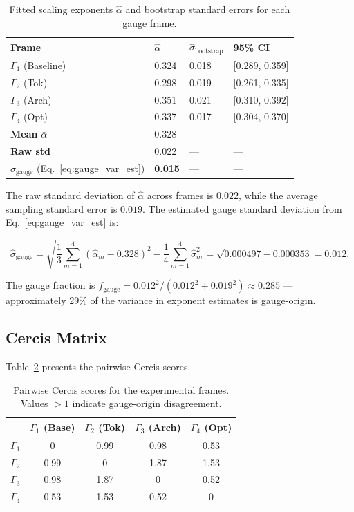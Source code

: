 \documentclass[12pt,a4paper]{article}
\theoremstyle{remark}
\begin{document}
\begin{table}[H]
\centering
\caption{Fitted scaling exponents $\hat{\alpha}$ and bootstrap standard errors for each gauge frame.}
\label{tab:results}
\begin{tabular}{@{}llll@{}}
\toprule
\textbf{Frame} & $\hat{\alpha}$ & $\hat{\sigma}_{\text{bootstrap}}$ & 95\% CI \\
\midrule
$\Gamma_1$ (Baseline) & 0.324 & 0.018 & [0.289, 0.359] \\
$\Gamma_2$ (Tok) & 0.298 & 0.019 & [0.261, 0.335] \\
$\Gamma_3$ (Arch) & 0.351 & 0.021 & [0.310, 0.392] \\
$\Gamma_4$ (Opt) & 0.337 & 0.017 & [0.304, 0.370] \\
\midrule
\textbf{Mean} $\bar{\alpha}$ & 0.328 & — & — \\
\textbf{Raw std} & 0.022 & — & — \\
\textbf{$\hat{\sigma}_{\text{gauge}}$} (Eq.~\ref{eq:gauge_var_est}) & \textbf{0.015} & — & — \\
\bottomrule
\end{tabular}
\end{table}

The raw standard deviation of $\hat{\alpha}$ across frames is $0.022$, while the average sampling standard error is $0.019$. The estimated gauge standard deviation from Eq.~\eqref{eq:gauge_var_est} is:

\begin{equation}
\hat{\sigma}_{\text{gauge}} = \sqrt{\frac{1}{3}\sum_{m=1}^4 (\hat{\alpha}_m - 0.328)^2 - \frac{1}{4}\sum_{m=1}^4 \hat{\sigma}_m^2} = \sqrt{0.000497 - 0.000353} = 0.012.
\end{equation}

The gauge fraction is $f_{\text{gauge}} = 0.012^2 / (0.012^2 + 0.019^2) \approx 0.285$ — approximately 29\% of the variance in exponent estimates is gauge-origin.

\subsection{Cercis Matrix}

Table~\ref{tab:cercis_exp} presents the pairwise Cercis scores.

\begin{table}[H]
\centering
\caption{Pairwise Cercis scores for the experimental frames. Values $> 1$ indicate gauge-origin disagreement.}
\label{tab:cercis_exp}
\begin{tabular}{@{}lcccc@{}}
\toprule
& $\Gamma_1$ (Base) & $\Gamma_2$ (Tok) & $\Gamma_3$ (Arch) & $\Gamma_4$ (Opt) \\
\midrule
$\Gamma_1$ & 0    & 0.99 & 0.98 & 0.53 \\
$\Gamma_2$ & 0.99 & 0    & 1.87 & 1.53 \\
$\Gamma_3$ & 0.98 & 1.87 & 0    & 0.52 \\
$\Gamma_4$ & 0.53 & 1.53 & 0.52 & 0    \\
\bottomrule
\end{tabular}
\end{table}
\end{document}
